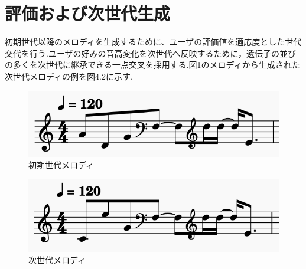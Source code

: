 \section{評価および次世代生成}
初期世代以降のメロディを生成するために、ユーザの評価値を適応度とした世代交代を行う.ユーザの好みの音高変化を次世代へ反映するために，遺伝子の並びの多くを次世代に継承できる一点交叉を採用する.図1のメロディから生成された次世代メロディの例を図4.2に示す.

\begin{figure}[htbp]
	\begin{center}
		\includegraphics[scale=0.9]{image/init.png}
		\caption{初期世代メロディ}
	\end{center}
\end{figure}

\begin{figure}[htbp]
	\begin{center}
		\includegraphics[scale=0.9]{image/nextInd.png}
		\caption{次世代メロディ}
	\end{center}
\end{figure}

